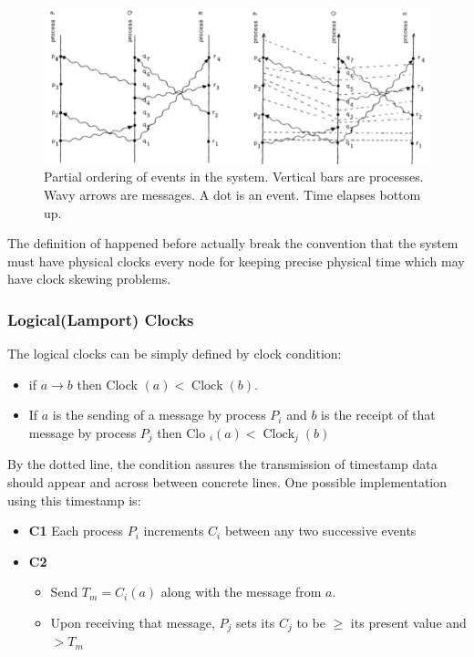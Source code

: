 \documentclass[acmlarge]{acmart}
\begin{document}
\begin{figure}[h]
  \centering
  \includegraphics[width=\linewidth]{partial_order.png}
  \caption{Partial ordering of events in the system. Vertical bars are processes.
    Wavy arrows are messages. A dot is an event. Time elapses bottom up.}
\end{figure}

The definition of happened before actually break the convention that the
system must have physical clocks every node for keeping precise physical
time which may have clock skewing problems.

\subsubsection{Logical(Lamport) Clocks}
The logical clocks can be simply defined by clock condition:
\begin{itemize}
  \item if $a \rightarrow b$ then Clock $(a)<\operatorname{Clock}(b)$.
  \item If $a$ is the sending of a message by process $P_{i}$ and $b$ is the receipt
        of that message by process $P_{j}$ then Clo ${ }_{i}(a)<\operatorname{Clock}_{j}(b)$
\end{itemize}
By the dotted line, the condition assures the transmission of timestamp data should appear and across between concrete lines. One possible
implementation using this timestamp is:

\begin{itemize}
  \item \textbf{C1} Each process $P_{i}$ increments $C_{i}$ between any two successive events
  \item \textbf{C2} \begin{itemize}
          \item Send $T_{m}=C_{i}(a)$ along with the message from $a$.
          \item Upon receiving that message, $P_{j}$ sets its $C_{j}$ to be $\geq$ its present value and $>T_{m}$
        \end{itemize}
\end{itemize}
\end{document}
